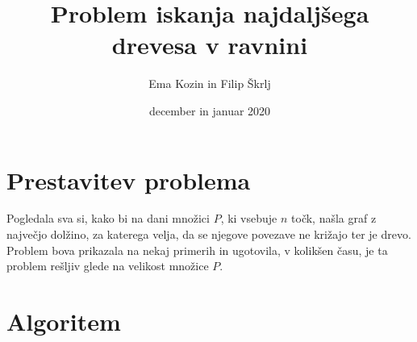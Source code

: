 \documentclass[a4paper,12pt]{article}
\title{Problem iskanja najdaljšega drevesa v ravnini}
\author{Ema Kozin in Filip Škrlj}
\date{december in januar 2020}
\begin{document}
	
\maketitle
	
\newpage
\section{Prestavitev problema}

Pogledala sva si, kako bi na dani množici $P$, ki vsebuje $n$ točk, našla graf z največjo dolžino, za katerega velja, da se njegove povezave ne križajo ter je drevo.
 Problem bova prikazala na nekaj primerih in ugotovila, v kolikšen času, je ta problem rešljiv glede na velikost množice $P$. 


\section{Algoritem}
\end{document}
